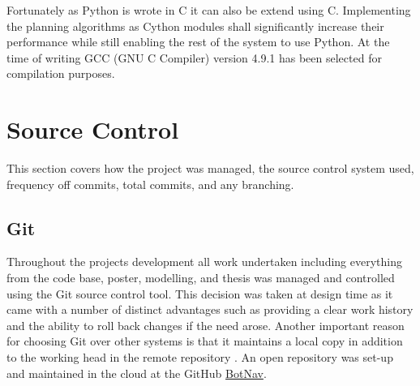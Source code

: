\noindent
Fortunately as Python is wrote in C it can also be extend using C. Implementing the planning algorithms as Cython modules shall significantly increase their performance while still enabling the rest of the system to use Python. At the time of writing GCC (GNU C Compiler) version 4.9.1 has been selected for compilation purposes.


\newpage

\section{Source Control}
This section covers how the project was managed, the source control system used, frequency off commits, total commits, and any branching.

\subsection{Git}
\noindent
Throughout the projects development all work undertaken including everything from the code base, poster, modelling, and thesis was managed and controlled using the Git source control tool. This decision was taken at design time as it came with a number of distinct advantages such as providing a clear work history and the ability to roll back changes if the need arose. Another important reason for choosing Git over other systems is that it maintains a local copy in addition to the working head in the remote repository \cite{GIT}. An open repository was set-up and maintained in the cloud at the GitHub \href{https://www.github.com/swordmaster2k/botnav}{BotNav}.

\newpage

